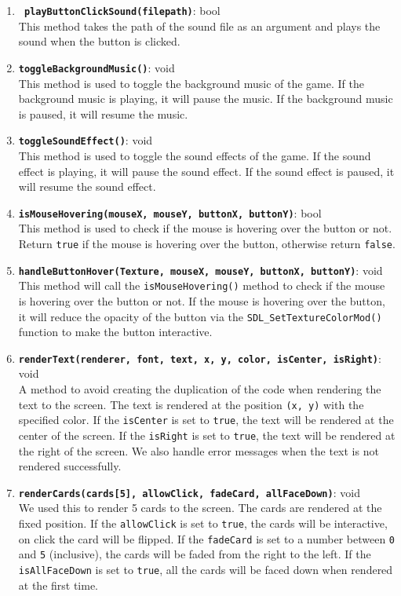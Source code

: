\begin{enumerate}
    \item \textbf{\texttt{ playButtonClickSound(filepath)}}: bool
    \\ This method takes the path of the sound file as an argument and plays the sound when the button is clicked.
    \item \textbf{\texttt{toggleBackgroundMusic()}}: void 
    \\ This method is used to toggle the background music of the game. If the background music is playing, it will pause the music. If the background music is paused, it will resume the music.
    \item \textbf{\texttt{toggleSoundEffect()}}: void
    \\ This method is used to toggle the sound effects of the game. If the sound effect is playing, it will pause the sound effect. If the sound effect is paused, it will resume the sound effect.
    \item \textbf{\texttt{isMouseHovering(mouseX, mouseY, buttonX, buttonY)}}: bool
    \\ This method is used to check if the mouse is hovering over the button or not. Return \texttt{true} if the mouse is hovering over the button, otherwise return \texttt{false}.
    \item \textbf{\texttt{handleButtonHover(Texture, mouseX, mouseY, buttonX, buttonY)}}: void
    \\ This method will call the \texttt{isMouseHovering()} method to check if the mouse is hovering over the button or not. If the mouse is hovering over the button, it will reduce the opacity of the button via the \texttt{SDL\_SetTextureColorMod()} function to make the button interactive.
    \item \textbf{\texttt{renderText(renderer, font, text, x, y, color, isCenter, isRight)}}: void
    \\ A method to avoid creating the duplication of the code when rendering the text to the screen. The text is rendered at the position \texttt{(x, y)} with the specified color. If the \texttt{isCenter} is set to \texttt{true}, the text will be rendered at the center of the screen. If the \texttt{isRight} is set to \texttt{true}, the text will be rendered at the right of the screen. We also handle error messages when the text is not rendered successfully.
    \item \textbf{\texttt{renderCards(cards[5], allowClick, fadeCard, allFaceDown)}}: void
    \\ We used this to render 5 cards to the screen. The cards are rendered at the fixed position. If the \texttt{allowClick} is set to \texttt{true}, the cards will be interactive, on click the card will be flipped. If the \texttt{fadeCard} is set to a number between \texttt{0} and \texttt{5} (inclusive), the cards will be faded from the right to the left. If the \texttt{isAllFaceDown} is set to \texttt{true}, all the cards will be faced down when rendered at the first time.

\end{enumerate}
